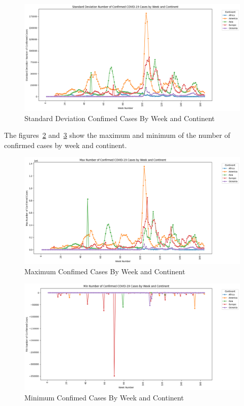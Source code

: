 \documentclass[12pt,oneside]{book} %
\begin{document}
\begin{figure}[H]
    \centering
    \includegraphics[width=1\textwidth]{images/std-confirmed-cases-by-week-and-continent.png}
    \caption{Standard Deviation Confimed Cases By Week and Continent}\label{fig:std-confirmed-cases-by-week-and-continent}
\end{figure}

\newpage
The figures~\ref{fig:max-confirmed-cases-by-week-and-continent} and~\ref{fig:min-confirmed-cases-by-week-and-continent} show the maximum and minimum of the number of confirmed cases by week and continent.

\begin{figure}[H]
    \centering
    \includegraphics[width=1\textwidth]{images/max-confirmed-cases-by-week-and-continent.png}
    \caption{Maximum Confimed Cases By Week and Continent}\label{fig:max-confirmed-cases-by-week-and-continent}
\end{figure}

\begin{figure}[H]
    \centering
    \includegraphics[width=1\textwidth]{images/min-confirmed-cases-by-week-and-continent.png}
    \caption{Minimum Confimed Cases By Week and Continent}\label{fig:min-confirmed-cases-by-week-and-continent}
\end{figure}
\end{document}
